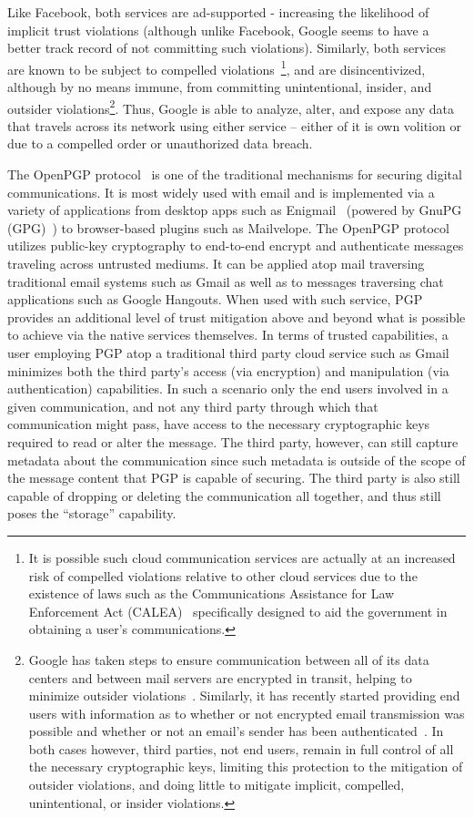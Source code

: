 Like Facebook, both services are ad-supported - increasing the
likelihood of implicit trust violations (although unlike Facebook,
Google seems to have a better track record of not committing such
violations). Similarly, both services are known to be subject to
compelled violations~\cite{google-transparency}\footnote{It is
  possible such cloud communication services are actually at an
  increased risk of compelled violations relative to other cloud
  services due to the existence of laws such as the Communications
  Assistance for Law Enforcement Act (CALEA)~\cite{calea-usc,
    calea-fcc} specifically designed to aid the government in
  obtaining a user's communications.}, and are disincentivized,
although by no means immune, from committing unintentional, insider,
and outsider violations\footnote{Google has taken steps to ensure
  communication between all of its data centers and between mail
  servers are encrypted in transit, helping to minimize outsider
  violations~\cite{gmail-blog-encryption}. Similarly, it has recently
  started providing end users with information as to whether or not
  encrypted email transmission was possible and whether or not an
  email's sender has been authenticated~\cite{gmail-blog-indicators}.
  In both cases however, third parties, not end users, remain in full
  control of all the necessary cryptographic keys, limiting this
  protection to the mitigation of outsider violations, and doing
  little to mitigate implicit, compelled, unintentional, or insider
  violations.}. Thus, Google is able to analyze, alter, and expose any
data that travels across its network using either service -- either of
it is own volition or due to a compelled order or unauthorized data
breach.

The OpenPGP protocol~\cite{callas2007} is one of the traditional
mechanisms for securing digital communications. It is most widely used
with email and is implemented via a variety of applications from
desktop apps such as Enigmail~\cite{enigmail} (powered by GnuPG
(GPG)~\cite{gnupg}) to browser-based plugins such as
Mailvelope\cite{mailvelope}. The OpenPGP protocol utilizes public-key
cryptography to end-to-end encrypt and authenticate messages traveling
across untrusted mediums. It can be applied atop mail traversing
traditional email systems such as Gmail as well as to messages
traversing chat applications such as Google Hangouts. When used with
such service, PGP provides an additional level of trust mitigation
above and beyond what is possible to achieve via the native services
themselves. In terms of trusted capabilities, a user employing PGP
atop a traditional third party cloud service such as Gmail minimizes
both the third party's access (via encryption) and manipulation (via
authentication) capabilities. In such a scenario only the end users
involved in a given communication, and not any third party through
which that communication might pass, have access to the necessary
cryptographic keys required to read or alter the message. The third
party, however, can still capture metadata about the communication
since such metadata is outside of the scope of the message content
that PGP is capable of securing. The third party is also still capable
of dropping or deleting the communication all together, and thus still
poses the ``storage'' capability.

